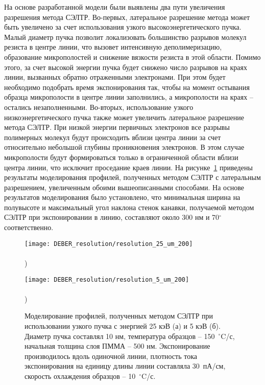 На основе разработанной модели были выявлены два пути увеличения разрешения метода СЭЛТР.
Во-первых, латеральное разрешение метода может быть увеличено за счет использования узкого высокоэнергетического пучка.
Малый диаметр пучка позволит локализовать большинство разрывов молекул резиста в центре линии, что вызовет интенсивную деполимеризацию, образование микрополостей и снижение вязкости резиста в этой области.
Помимо этого, за счет высокой энергии пучка будет снижено число разрывов на краях линии, вызванных обратно отраженными электронами.
При этом будет необходимо подобрать время экспонирования так, чтобы на момент остывания образца микрополости в центре линии заполнились, а микрополости на краях -- остались незаполненными.
Во-вторых, использование узкого низкоэнергетического пучка также может увеличить латеральное разрешение метода СЭЛТР.
При низкой энергии первичных электронов все разрывы полимерных молекул будут происходить вблизи центра линии за счет относительно небольшой глубины проникновения электронов.
В этом случае микрополости будут формироваться только в ограниченной области вблизи центра линии, что исключит проседание краев линии.
На рисунке~\ref{fig:DEBER_resolution} приведены результаты моделирования профилей, полученных методом СЭЛТР с латеральным разрешением, увеличенным обоими вышеописанными способами.
На основе результатов моделирования было установлено, что минимальная ширина на полувысоте и максимальный угол наклона стенок канавки, получаемой методом СЭЛТР при экспонировании в линию, составляют около 300 нм и 70$^\circ$ соответственно.

\begin{figure}[h]
	\begin{minipage}{0.48\textwidth}
		\texttt{[image: DEBER\_resolution/resolution\_25\_um\_200]} \\
		\vspace{-28.7ex} \\ ) \\ \vspace{28.7ex}
	\end{minipage}
	\begin{minipage}{0.48\textwidth}
		\texttt{[image: DEBER\_resolution/resolution\_5\_um\_200]} \\
		\vspace{-28.7ex} \\ ) \\ \vspace{28.7ex}
	\end{minipage}
	\vspace{-3.5em}
	\caption{
		Моделирование профилей, полученных методом СЭЛТР при использовании узкого пучка с энергией 25 кэВ (а) и 5 кэВ (б).
		Диаметр пучка составлял 10 нм, температура образцов -- 150~$^\circ$C/с, начальная толщина слоя ПММА -- 500 нм.
		Экспонирование производилось вдоль одиночной линии, плотность тока экспонирования на единицу длины линии составляла 30~пА/см, скорость охлаждения образцов -- 10~$^\circ$C/с.}
	\label{fig:DEBER_resolution}
\end{figure}

